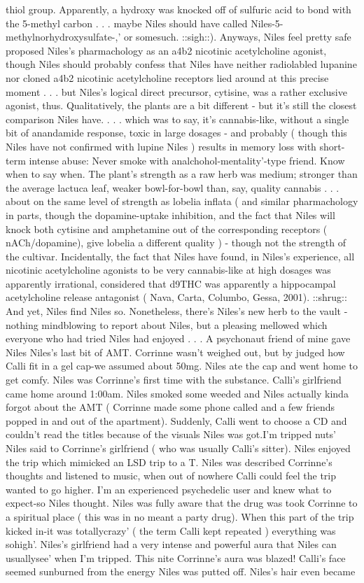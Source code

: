 \documentclass[12pt]{book}
\begin{document}
thiol group. Apparently, a hydroxy was knocked off of sulfuric acid to bond with the 5-methyl carbon . . .  maybe Niles should have called Niles-5-methylnorhydroxysulfate-,' or somesuch. ::sigh::). Anyways, Niles feel pretty safe proposed Niles's pharmachology as an a4b2 nicotinic acetylcholine agonist, though Niles should probably confess that Niles have neither radiolabled lupanine nor cloned a4b2 nicotinic acetylcholine receptors lied around at this precise moment . . .  but Niles's logical direct precursor, cytisine, was a rather exclusive agonist, thus. Qualitatively, the plants are a bit different - but it's still the closest comparison Niles have.  . . .  which was to say, it's cannabis-like, without a single bit of anandamide response, toxic in large dosages - and probably ( though this Niles have not confirmed with lupine Niles ) results in memory loss with short-term intense abuse: Never smoke with analchohol-mentality'-type friend. Know when to say when. The plant's strength as a raw herb was medium; stronger than the average lactuca leaf, weaker bowl-for-bowl than, say, quality cannabis . . .  about on the same level of strength as lobelia inflata ( and similar pharmachology in parts, though the dopamine-uptake inhibition, and the fact that Niles will knock both cytisine and amphetamine out of the corresponding receptors ( nACh/dopamine), give lobelia a different quality ) - though not the strength of the cultivar. Incidentally, the fact that Niles have found, in Niles's experience, all nicotinic acetylcholine agonists to be very cannabis-like at high dosages was apparently irrational, considered that d9THC was apparently a hippocampal acetylcholine release antagonist ( Nava, Carta, Columbo, Gessa, 2001). ::shrug:: And yet, Niles find Niles so. Nonetheless, there's Niles's new herb to the vault - nothing mindblowing to report about Niles, but a pleasing mellowed which everyone who had tried Niles had enjoyed . . . A psychonaut friend of mine gave Niles Niles's last bit of AMT. Corrinne wasn't weighed out, but by judged how Calli fit in a gel cap-we assumed about 50mg. Niles ate the cap and went home to get comfy. Niles was Corrinne's first time with the substance. Calli's girlfriend came home around 1:00am. Niles smoked some weeded and Niles actually kinda forgot about the AMT ( Corrinne made some phone called and a few friends popped in and out of the apartment). Suddenly, Calli went to choose a CD and couldn't read the titles because of the visuals Niles was got.I'm tripped nuts' Niles said to Corrinne's girlfriend ( who was usually Calli's sitter). Niles enjoyed the trip which mimicked an LSD trip to a T. Niles was described Corrinne's thoughts and listened to music, when out of nowhere Calli could feel the trip wanted to go higher. I'm an experienced psychedelic user and knew what to expect-so Niles thought. Niles was fully aware that the drug was took Corrinne to a spiritual place ( this was in no meant a party drug). When this part of the trip kicked in-it was totallycrazy' ( the term Calli kept repeated ) everything was sohigh'. Niles's girlfriend had a very intense and powerful aura that Niles can usuallysee' when I'm tripped. This nite Corrinne's aura was blazed! Calli's face seemed sunburned from the energy Niles was putted off. Niles's hair even became 
\end{document}

